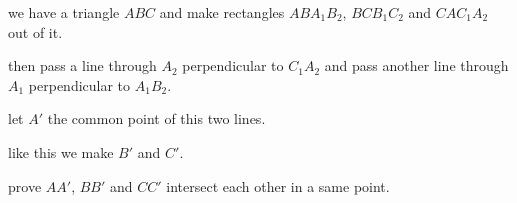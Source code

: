 we have  a triangle $ ABC $ and make rectangles $ ABA_1B_2 $, $ BCB_1C_2 $ and $ CAC_1A_2 $ out of it.

then pass a line through $ A_2 $ perpendicular to $ C_1A_2 $ and pass another line through $ A_1 $ perpendicular to $  A_1B_2 $.

let $ A' $ the common point of this two lines.

like this we make $ B' $ and $ C' $.

prove $ AA' $, $ BB' $ and $ CC' $ intersect each other in a same point.